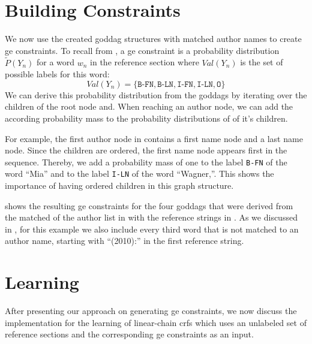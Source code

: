 \section{Building  Constraints}\label{sec:i-building-ge-constraints}

We now use the created \gls{goddag} structures with matched author names to create \gls{ge} constraints.
To recall from , a \gls{ge} constraint is a \gls{probability distribution} $\tilde{P}(Y_n)$ for a word $w_n$ in the reference section where $\textit{Val}(Y_n)$ is the set of possible labels for this word:
\begin{equation*}
  \mathit{Val}(Y_n)=\{\texttt{B-FN},\texttt{B-LN},\texttt{I-FN},\texttt{I-LN},\texttt{O}\}
\end{equation*}
We can derive this \gls{probability distribution} from the \glspl{goddag} by iterating over the children of the root node and.
When reaching an author node, we can add the according probability mass to the probability distributions of of it's children.

For example, the first author node in  contains a first name node and a last name node.
Since the children are ordered, the first name node appears first in the sequence.
Thereby, we add a probability mass of one to the label \texttt{B-FN} of the word ``Mia'' and to the label \texttt{I-LN} of the word ``Wagner,''.
This shows the importance of having ordered children in this graph structure.

 shows the resulting \gls{ge} constraints for the four \glspl{goddag} that were derived from the matched of the author list in  with the reference strings in .
As we discussed in , for this example we also include every third word that is not matched to an author name, starting with ``(2010):'' in the first reference string.

\section{Learning }\label{sec:i-learning-crfs}

After presenting our approach on generating \gls{ge} constraints, we now discuss the implementation for the learning of \glspl{linear-chain crf} which uses an unlabeled set of reference sections and the corresponding \gls{ge} constraints as an input.

